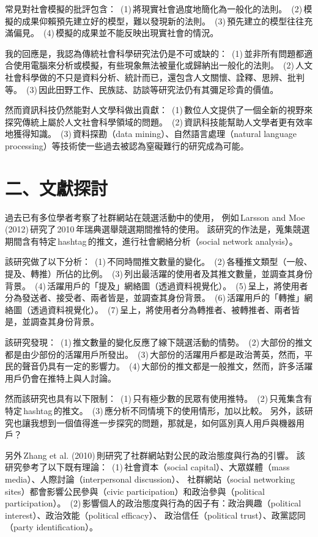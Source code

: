 \documentclass[letterpaper, 10pt, conference]{ieeeconf}   %
\begin{document}
\begin{CJK}{UTF8}{bsmi}
常見對社會模擬的批評包含：
\,(1)\,將現實社會過度地簡化為一般化的法則。
\,(2)\,模擬的成果仰賴預先建立好的模型，難以發現新的法則。
\,(3)\,預先建立的模型往往充滿偏見。
\,(4)\,模擬的成果並不能反映出現實社會的情況。

我的回應是，我認為傳統社會科學研究法仍是不可或缺的：
\,(1)\,並非所有問題都適合使用電腦來分析或模擬，有些現象無法被量化或歸納出一般化的法則。
\,(2)\,人文社會科學做的不只是資料分析、統計而已，還包含人文關懷、詮釋、思辨、批判等。
\,(3)\,因此田野工作、民族誌、訪談等研究法仍有其彌足珍貴的價值。

然而資訊科技仍然能對人文學科做出貢獻：
\,(1)\,數位人文提供了一個全新的視野來探究傳統上屬於人文社會科學領域的問題。
\,(2)\,資訊科技能幫助人文學者更有效率地獲得知識。
\,(3)\,資料探勘（data mining）、自然語言處理（natural language processing）等技術使一些過去被認為窒礙難行的研究成為可能。

\section*{二、文獻探討}

過去已有多位學者考察了社群網站在競選活動中的使用，
例如\,Larsson and Moe (2012)\,研究了\,2010\,年瑞典選舉競選期間推特的使用。\cite{c1}
該研究的作法是，蒐集競選期間含有特定\,hashtag\,的推文，進行社會網絡分析（social network analysis）。

該研究做了以下分析：
\,(1)\,不同時間推文數量的變化。
\,(2)\,各種推文類型（一般、提及、轉推）所佔的比例。
\,(3)\,列出最活躍的使用者及其推文數量，並調查其身份背景。
\,(4)\,活躍用戶的「提及」網絡圖（透過資料視覺化）。
\,(5)\,呈上，將使用者分為發送者、接受者、兩者皆是，並調查其身份背景。
\,(6)\,活躍用戶的「轉推」網絡圖（透過資料視覺化）。
\,(7)\,呈上，將使用者分為轉推者、被轉推者、兩者皆是，並調查其身份背景。

該研究發現：
\,(1)\,推文數量的變化反應了線下競選活動的情勢。
\,(2)\,大部份的推文都是由少部份的活躍用戶所發出。
\,(3)\,大部份的活躍用戶都是政治菁英，然而，平民的聲音仍具有一定的影響力。
\,(4)\,大部份的推文都是一般推文，然而，許多活躍用戶仍會在推特上與人討論。

然而該研究也具有以下限制：
\,(1)\,只有極少數的民眾有使用推特。
\,(2)\,只蒐集含有特定\,hashtag\,的推文。
\,(3)\,應分析不同情境下的使用情形，加以比較。
另外，該研究也讓我想到一個值得進一步探究的問題，那就是，如何區別真人用戶與機器用戶？

另外\,Zhang et al. (2010)\,則研究了社群網站對公民的政治態度與行為的引響。\cite{c2}
該研究參考了以下既有理論：
\,(1)\,社會資本（social capital）、大眾媒體（mass media）、人際討論（interpersonal discussion）、
社群網站（social networking sites）都會影響公民參與（civic participation）和政治參與（political participation）。
\,(2)\,影響個人的政治態度與行為的因子有：政治興趣（political interest）、政治效能（political efficacy）、
政治信任（political trust）、政黨認同（party identification）。


\end{CJK}
\end{document}
